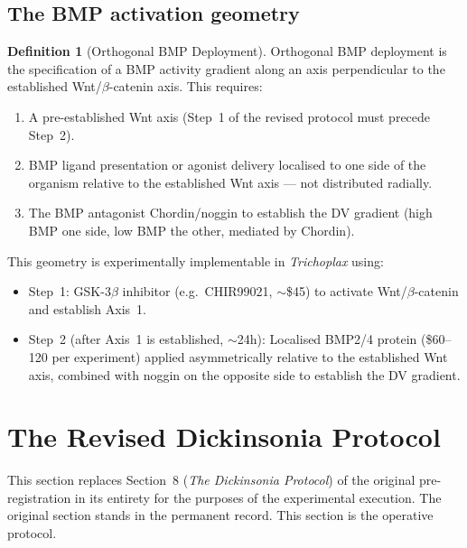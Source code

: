 \documentclass[12pt, a4paper]{article}
\theoremstyle{definition}
\newtheorem{definition}{Definition}[section]
\theoremstyle{remark}
\begin{document}
\subsection{The BMP activation geometry}

\begin{definition}[Orthogonal BMP Deployment]
Orthogonal BMP deployment is the specification of a
BMP activity gradient along an axis perpendicular to
the established Wnt/$\beta$-catenin axis. This requires:
\begin{enumerate}[label=(\roman*)]
  \item A pre-established Wnt axis (Step~1 of the
        revised protocol must precede Step~2).
  \item BMP ligand presentation or agonist delivery
        localised to one side of the organism relative
        to the established Wnt axis --- not distributed
        radially.
  \item The BMP antagonist Chordin/noggin to establish
        the DV gradient (high BMP one side, low BMP
        the other, mediated by Chordin).
\end{enumerate}
\end{definition}

This geometry is experimentally implementable in
\textit{Trichoplax} using:
\begin{itemize}
  \item Step~1: GSK-3$\beta$ inhibitor (e.g.\ CHIR99021,
        $\sim$\$45) to activate Wnt/$\beta$-catenin and
        establish Axis~1.
  \item Step~2 (after Axis~1 is established, $\sim$24h):
        Localised BMP2/4 protein (\$60--120 per experiment)
        applied asymmetrically relative to the established
        Wnt axis, combined with noggin on the opposite
        side to establish the DV gradient.
\end{itemize}

\section{The Revised Dickinsonia Protocol}

This section replaces Section~8
(\textit{The Dickinsonia Protocol}) of the original
pre-registration in its entirety for the purposes of the
experimental execution. The original section stands in the
permanent record. This section is the operative protocol.
\end{document}
